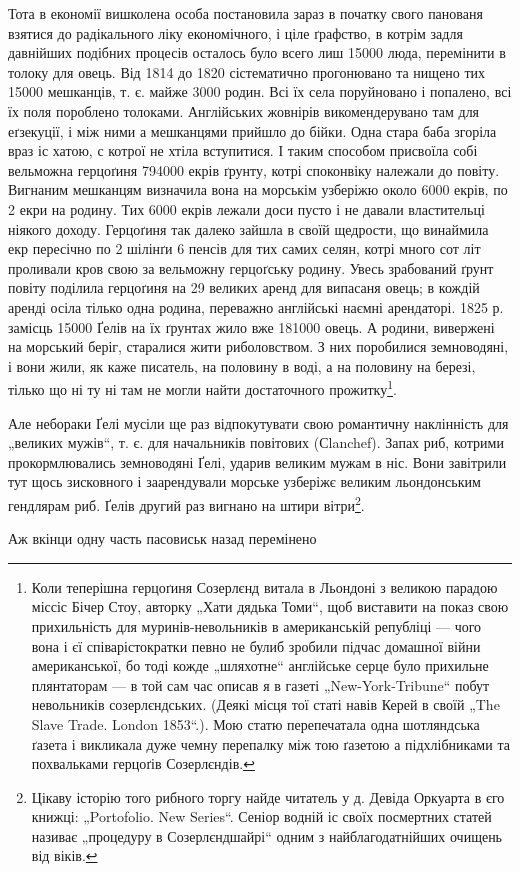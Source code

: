 Тота в економії вишколена особа постановила зараз в початку свого панованя взятися до радікального
ліку економічного, і ціле ґрафство, в котрім задля давнійших подібних процесів осталось
було всего лиш 15000 люда, перемінити в толоку для овець. Від 1814 до 1820 сістематично
прогонювано та нищено тих 15000 мешканців, т. є. майже 3000 родин. Всі їх села поруйновано і
попалено, всі їх поля пороблено толоками. Англійських жовнірів викомендерувано там для еґзекуції, і
між ними а мешканцями прийшло до бійки. Одна
стара баба згоріла враз іс хатою, с котрої не хтіла вступитися. І таким способом присвоїла собі
вельможна герцоґиня 794000 екрів ґрунту, котрі споконвіку належали до
повіту. Вигнаним мешканцям визначила вона на морськім узберіжю около 6000 екрів, по 2 екри на
родину. Тих 6000 екрів лежали доси пусто і не давали властительці ніякого
доходу. Герцоґиня так далеко зайшла в своїй щедрости, що винаймила екр пересічно по 2 шілінґи 6
пенсів для тих самих селян, котрі много сот літ проливали кров свою за
вельможну герцоґську родину. Увесь зрабований ґрунт повіту поділила герцоґиня на 29 великих аренд
для випасаня овець; в кождій аренді осіла тілько одна родина, переважно англійські наємні
арендаторі. 1825 р. замісць 15000 Ґелів на їх ґрунтах жило вже 181000 овець. А родини, вивержені на
морський беріг, старалися жити риболовством. З них поробилися земноводяні, і вони жили, як каже
писатель, на половину в воді, а на половину на березі, тілько що ні ту ні там не могли найти
достаточного прожитку\footnote{
Коли теперішна герцоґиня Созерлєнд витала в Льондоні з великою парадою міссіс Бічер Стоу,
авторку „Хати дядька Томи“, щоб виставити на показ свою прихильність для муринів-невольників в
американській републіці — чого вона і єї співарістократки певно не булиб зробили підчас домашної
війни американської, бо тоді кожде „шляхотне“ англійське серце було прихильне плянтаторам — в той
сам час описав
я в газеті „New-York-Tribune“ побут невольників созерлєндських. (Деякі місця тої статі навів Керей в
своїй „The Slave Trade. London 1853“.). Мою статю перепечатала одна шотляндська ґазета і викликала
дуже чемну перепалку між тою ґазетою а підхлібниками та похвальками герцоґів Созерлєндів.
}.

Але небораки Ґелі мусіли ще раз відпокутувати свою романтичну наклінність для „великих мужів“, т. є.
для начальників повітових (Сlanchef). Запах риб, котрими прокормлювались земноводяні Ґелі, ударив
великим мужам в ніс. Вони завітрили тут щось зисковного і заарендували морське узберіжє великим
льондонським гендлярам риб. Ґелів другий раз вигнано на штири вітри\footnote{
Цікаву історію того рибного торгу найде читатель у д. Девіда Оркуарта в єго книжці: „Portofolio.
New Series“. Сеніор водній іс своїх посмертних статей називає „процедуру в Созерлєндшайрі“ одним з
найблагодатнійших очищень від віків.
}.

Аж вкінци одну часть пасовиськ назад перемінено
\parbreak{}
